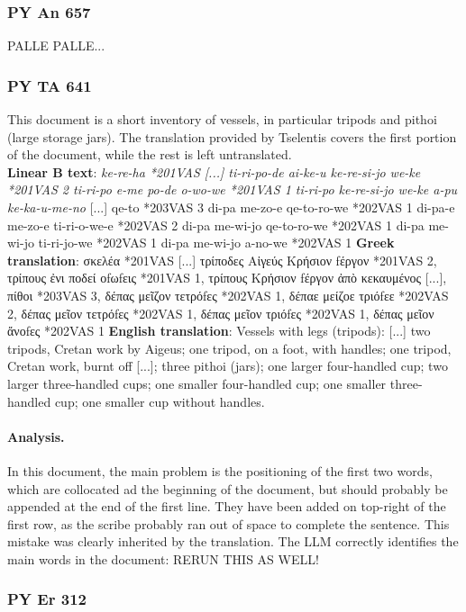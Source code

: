 \subsubsection{PY An 657}
PALLE PALLE...

\subsubsection{PY TA 641}
This document is a short inventory of vessels, in particular tripods and pithoi (large storage jars).
The translation provided by Tselentis covers the first portion of the document, while the rest is left untranslated. \\

\textbf{Linear B text}: \textit{ke-re-ha *201VAS [...] ti-ri-po-de ai-ke-u ke-re-si-jo we-ke *201VAS 2 ti-ri-po e-me po-de o-wo-we *201VAS 1 ti-ri-po ke-re-si-jo we-ke a-pu ke-ka-u-me-no} [...] qe-to *203VAS 3 di-pa me-zo-e qe-to-ro-we *202VAS 1 di-pa-e me-zo-e ti-ri-o-we-e *202VAS 2 di-pa me-wi-jo qe-to-ro-we *202VAS 1 di-pa me-wi-jo ti-ri-jo-we *202VAS 1 di-pa me-wi-jo a-no-we *202VAS 1
\textbf{Greek translation}: σκελέα *201VAS [...] τρίποδες Αἰγεύς Κρήσιον fέργον *201VAS 2, τρίπους ἐνι ποδεί οfωfεις *201VAS 1, τρίπους Κρήσιον fέργον ἀπὸ κεκαυμένος [...], πίθοι *203VAS 3, δέπας μεῖζον τετρόfες *202VAS 1, δέπαε μείζοε τριόfεε *202VAS 2, δέπας μεῖον τετρόfες *202VAS 1, δέπας μεῖον τριόfες *202VAS 1, δέπας μεῖον ἄνοfες *202VAS 1
\textbf{English translation}: Vessels with legs (tripods): [...] two tripods, Cretan work by Aigeus; one tripod, on a foot, with handles; one tripod, Cretan work, burnt off [...]; three pithoi (jars); one larger four-handled cup; two larger three-handled cups; one smaller four-handled cup; one smaller three-handled cup; one smaller cup without handles.

\paragraph{Analysis.}
In this document, the main problem is the positioning of the first two words, which are collocated ad the beginning of the document, but should probably be appended at the end of the first line.
They have been added on top-right of the first row, as the scribe probably ran out of space to complete the sentence.
This mistake was clearly inherited by the translation.
The LLM correctly identifies the main words in the document:
RERUN THIS AS WELL! 

\subsubsection{PY Er 312}


